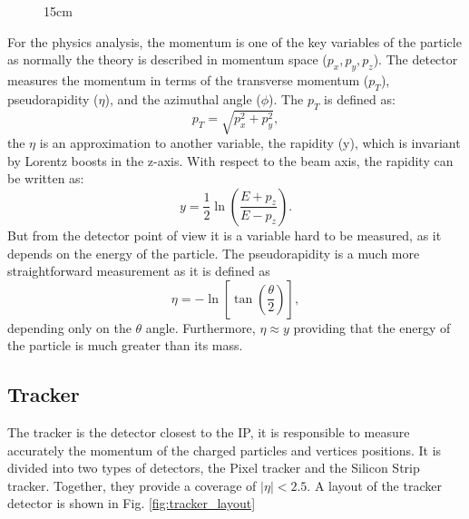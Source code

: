 \begin{figure}[!htm]{15cm}
{
}
\end{figure}

For the physics analysis, the momentum is one of the key variables of the particle as normally the theory is described in momentum space ($p_x, p_y, p_z$). The detector measures the momentum in terms of the transverse momentum ($p_T$), pseudorapidity ($\eta$), and the azimuthal angle ($\phi$). The $p_T$ is defined as:
\begin{equation}
    p_T = \sqrt{p_x^2 + p_y^2},
\end{equation}
the $\eta$ is an approximation to another variable, the rapidity (y), which is invariant by Lorentz boosts in the z-axis. With respect to the beam axis, the rapidity can be written as:
\begin{equation}
    y = \frac{1}{2} \ln{\left( \frac{E + p_z}{E - p_z} \right)}.
\end{equation}
But from the detector point of view it is a variable hard to be measured, as it depends on the energy of the particle. The pseudorapidity is a much more straightforward measurement as it is defined as
\begin{equation}
    \eta = - \ln {\left[ \tan{\left( \frac{\theta}{2} \right)} \right]},
\end{equation}
depending only on the $\theta$ angle. Furthermore, $\eta \approx y$ providing that the energy of the particle is much greater than its mass.

\subsection{Tracker}

The tracker is the detector closest to the IP, it is responsible to measure accurately the momentum of the charged particles and vertices positions. It is divided into two types of detectors, the Pixel tracker and the Silicon Strip tracker. Together, they provide a coverage of $|\eta| < 2.5$. A layout of the tracker detector is shown in Fig. \ref{fig:tracker_layout}

